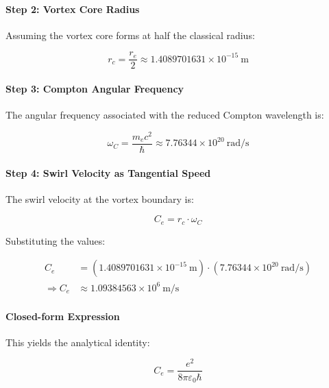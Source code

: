 \documentclass[11pt]{article}
\begin{document}
    \paragraph{Step 2: Vortex Core Radius}
    Assuming the vortex core forms at half the classical radius:

    \begin{equation}
        r_c = \frac{r_e}{2} \approx 1.4089701631 \times 10^{-15}~\text{m}
    \end{equation}

    \paragraph{Step 3: Compton Angular Frequency}
    The angular frequency associated with the reduced Compton wavelength is:

    \begin{equation}
        \omega_C = \frac{m_e c^2}{\hbar} \approx 7.76344 \times 10^{20}~\text{rad/s}
    \end{equation}

    \paragraph{Step 4: Swirl Velocity as Tangential Speed}
    The swirl velocity at the vortex boundary is:

    \begin{equation}
        C_e = r_c \cdot \omega_C
    \end{equation}

    \noindent
    Substituting the values:

    \begin{align}
        C_e &= \left(1.4089701631 \times 10^{-15}~\text{m}\right) \cdot \left(7.76344 \times 10^{20}~\text{rad/s}\right) \nonumber \\
        \Rightarrow C_e &\approx \boxed{1.09384563 \times 10^6~\text{m/s}}
    \end{align}

    \paragraph{Closed-form Expression}
    This yields the analytical identity:

    \begin{equation}
        C_e = \frac{e^2}{8\pi\varepsilon_0 \hbar}
    \end{equation}
\end{document}
